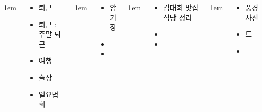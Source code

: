 \documentclass[	20pt, 
							a0paper, 
							landscape,
							margin=0mm, %
							innermargin=10mm,  		%
							blockverticalspace=4mm, %
							colspace=5mm, 
							subcolspace=0mm
							]{tikzposter}
\begin{document}
\begin{columns}
			{
					\setlength{\leftmargini}{4em}
					\setlength{\labelsep} {1em}
				\begin{LARGE}
					\begin{itemize}
					\item 퇴근
					\item 퇴근 : 주말 퇴근
					\item 여행
					\item 출장
					\item 일요법회
					\end{itemize}
				\end{LARGE}
			} %


			{
					\setlength{\leftmargini}{4em}
					\setlength{\labelsep} {1em}
				\begin{LARGE}
					\begin{itemize}
					\item 암기장
					\item 
					\item 
					\end{itemize}
				\end{LARGE}
			} %


			{
					\setlength{\leftmargini}{4em}
					\setlength{\labelsep} {1em}
				\begin{LARGE}
					\begin{itemize}
					\item 김대희 맛집 식당 정리
					\item 
					\item 
					\end{itemize}
				\end{LARGE}
			} %

			{
					\setlength{\leftmargini}{4em}
					\setlength{\labelsep} {1em}
				\begin{LARGE}
					\begin{itemize}
					\item 풍경 사진
					\item 트
					\item 
					\end{itemize}
				\end{LARGE}
			} %


\end{columns}
\end{document}

